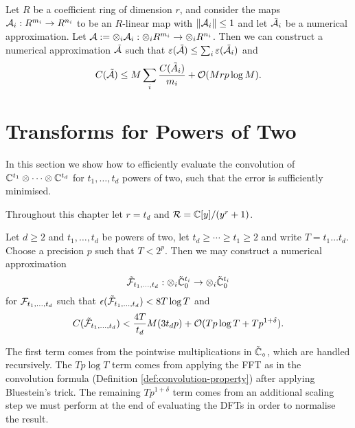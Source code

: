 \begin{lemma}\label{lem:tensor-products}
    Let $R$ be a coefficient ring of dimension $r$, and consider the maps $\mathcal A_i : R^{m_i} \to R^{n_i}$ to be an $R$-linear map with $\|\mathcal A_i\| \le 1$ and let $\tilde{\mathcal A_i}$ be a numerical approximation. Let $\mathcal A := \otimes_i \mathcal A_i : \otimes_i R^{m_i} \to \otimes_i R^{n_i}$. Then we can construct a numerical approximation $\tilde{\mathcal A}$ such that $\varepsilon(\tilde{\mathcal A}) \le \sum_i \varepsilon(\tilde{\mathcal A}_i)$ and
    \[
        C(\tilde{\mathcal A}) \le M \sum_i\frac{C(\tilde{A}_i)}{m_i} + \mathcal O(Mrp \log M).
    \]
\end{lemma}

\section{Transforms for Powers of Two}
\label{sec:transfoms-for-powers-of-two}

In this section we show how to efficiently evaluate the convolution of ${\mathbb C}^{t_1} \otimes \cdots \otimes {\mathbb C}^{t_d}$ for $t_1, \ldots, t_d$ powers of two, such that the error is sufficiently minimised.

Throughout this chapter let $r = t_d$ and $\mathcal R = {\mathbb C}[y] / (y^r + 1)$.

\begin{theorem}\label{thm:main-3}
    Let $d \geq 2$ and $t_1, \ldots, t_d$ be powers of two, let $t_d \geq \cdots \geq t_1 \geq 2$ and write $T = t_1 \ldots t_d$. Choose a precision $p$ such that $T < 2^p$. Then we may construct a numerical approximation
    \[
        \tilde {\mathcal F}_{t_1, \ldots, t_d} : \otimes_i \tilde{{\mathbb C}}^{t_i}_0 \to \otimes_i \tilde{{\mathbb C}}^{t_i}_0
    \]
    for $\mathcal F_{t_1, \ldots, t_d}$ such that $\epsilon(\tilde{\mathcal F}_{t_1, \ldots, t_d}) < 8 T \log T$ and
    \[
        C(\tilde{\mathcal F}_{t_1, \ldots, t_d}) < \frac{4T}{t_d} M(3t_d p) + \mathcal O(Tp\log T + Tp^{1 + \delta}).
    \]
\end{theorem}

The first term comes from the pointwise multiplications in $\tilde{{\mathbb C}}_\circ$, which are handled recursively. The $Tp \log T$ term comes from applying the FFT as in the convolution formula (Definition \ref{def:convolution-property}) after applying Bluestein's trick. The remaining $Tp^{1 + \delta}$ term comes from an additional scaling step we must perform at the end of evaluating the DFTs in order to normalise the result.

